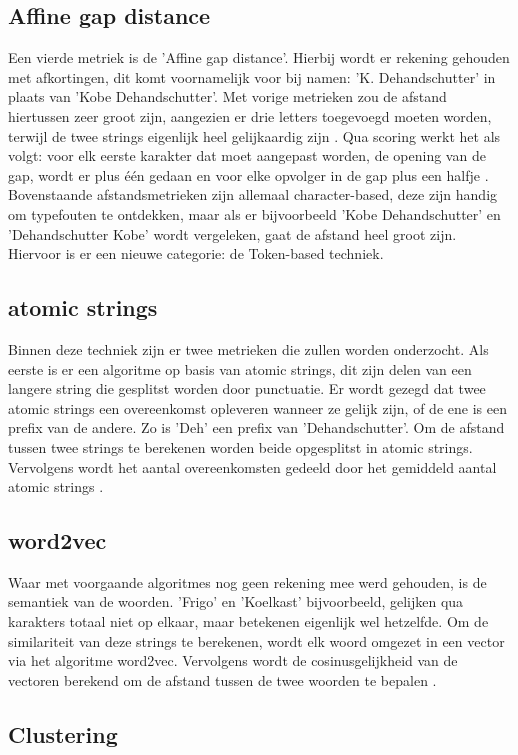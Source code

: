 \subsection{Affine gap distance}
Een vierde metriek is de 'Affine gap distance'. Hierbij wordt er rekening gehouden met afkortingen, dit komt voornamelijk voor bij namen: 'K. Dehandschutter' in plaats van 'Kobe Dehandschutter'. Met vorige metrieken zou de afstand hiertussen zeer groot zijn, aangezien er drie letters toegevoegd moeten worden, terwijl de twee strings eigenlijk heel gelijkaardig zijn \autocite{Walgran2019}. Qua scoring werkt het als volgt: voor elk eerste karakter dat moet aangepast worden, de opening van de gap, wordt er plus één gedaan en voor elke opvolger in de gap plus een halfje \autocite{Lievens2022}.
\\\indent
Bovenstaande afstandsmetrieken zijn allemaal character-based, deze zijn handig om typefouten te ontdekken, maar als er bijvoorbeeld 'Kobe Dehandschutter' en 'Dehandschutter Kobe' wordt vergeleken, gaat de afstand heel groot zijn. Hiervoor is er een nieuwe categorie: de Token-based techniek.
\subsection{atomic strings}
Binnen deze techniek zijn er twee metrieken die zullen worden onderzocht. Als eerste is er een algoritme op basis van atomic strings, dit zijn delen van een langere string die gesplitst worden door punctuatie. Er wordt gezegd dat twee atomic strings een overeenkomst opleveren wanneer ze gelijk zijn, of de ene is een prefix van de andere. Zo is 'Deh' een prefix van 'Dehandschutter'. Om de afstand tussen twee strings te berekenen worden beide opgesplitst in atomic strings. Vervolgens wordt het aantal overeenkomsten gedeeld door het gemiddeld aantal atomic strings \autocite{Lievens2022}.
\subsection{word2vec}
Waar met voorgaande algoritmes nog geen rekening mee werd gehouden, is de semantiek van de woorden. 'Frigo' en 'Koelkast' bijvoorbeeld, gelijken qua karakters totaal niet op elkaar, maar betekenen eigenlijk wel hetzelfde. Om de similariteit van deze strings te berekenen, wordt elk woord omgezet in een vector via het algoritme word2vec. Vervolgens wordt de cosinusgelijkheid van de vectoren berekend om de afstand tussen de twee woorden te bepalen \autocite{Lievens2022}.
\subsection{Clustering}

